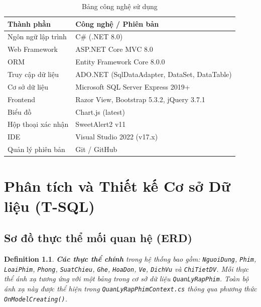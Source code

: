 \documentclass[12pt,a4paper,oneside]{book}
\theoremstyle{plain}
\newtheorem{de}[thm]{Definition}
\numberwithin{equation}{chapter}
\begin{document}
\begin{table}[H]
    \begin{center}
        \begin{tabular}{|l|l|}
            \hline
            \textbf{Thành phần} & \textbf{Công nghệ / Phiên bản} \\
            \hline
            Ngôn ngữ lập trình & C\# (.NET 8.0) \\
            \hline
            Web Framework      & ASP.NET Core MVC 8.0 \\
            \hline
            ORM                & Entity Framework Core 8.0.0 \\
            \hline
            Truy cập dữ liệu   & ADO.NET (SqlDataAdapter, DataSet, DataTable) \\
            \hline
            Cơ sở dữ liệu     & Microsoft SQL Server Express 2019+ \\
            \hline
            Frontend           & Razor View, Bootstrap 5.3.2, jQuery 3.7.1 \\
            \hline
            Biểu đồ            & Chart.js (latest) \\
            \hline
            Hộp thoại xác nhận & SweetAlert2 v11 \\
            \hline
            IDE                & Visual Studio 2022 (v17.x) \\
            \hline
            Quản lý phiên bản  & Git / GitHub \\
            \hline
        \end{tabular}
    \end{center}
    \caption{Bảng công nghệ sử dụng}\label{table_tech}
\end{table}

\chapter{Phân tích và Thiết kế Cơ sở Dữ liệu (T-SQL)}

\section{Sơ đồ thực thể mối quan hệ (ERD)}\label{Sec2.1}

\begin{de}\label{def1}
    \textbf{Các thực thể chính} trong hệ thống bao gồm: \texttt{NguoiDung}, \texttt{Phim}, \texttt{LoaiPhim}, \texttt{Phong}, \texttt{SuatChieu}, \texttt{Ghe}, \texttt{HoaDon}, \texttt{Ve}, \texttt{DichVu} và \texttt{ChiTietDV}. Mỗi thực thể ánh xạ tương ứng với một bảng trong cơ sở dữ liệu \texttt{QuanLyRapPhim}. Toàn bộ ánh xạ này được thể hiện trong \texttt{QuanLyRapPhimContext.cs} thông qua phương thức \texttt{OnModelCreating()}.
\end{de}
\end{document}
